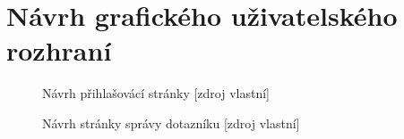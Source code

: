 

\chapter{Návrh grafického uživatelského rozhraní}
\label{PrilohGrafNavrh}

    \begin{figure}[!h]
    \begin{center}
    \caption{Návrh přihlašovácí stránky [zdroj vlastní]}
    \label{guiPrihlaseni}
    \end{center}
    \end{figure}
    
    \begin{figure}[!h]
    \begin{center}
    \caption{Návrh stránky správy dotazníku [zdroj vlastní]}
    \label{guiDotaz}
    \end{center}
    \end{figure}


